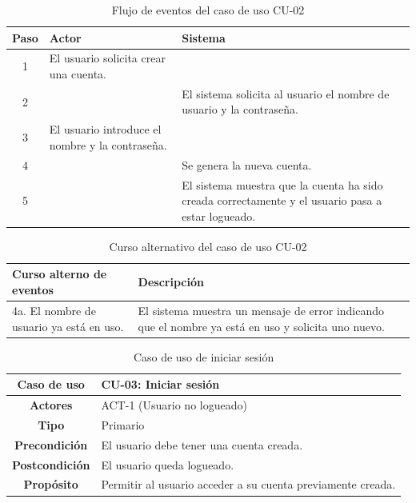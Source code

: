 \begin{table}[H]
\centering
\begin{tabular}{|c|p{5cm}|p{5cm}|}
\hline
\rowcolor{green!40} \textbf{Paso} & \textbf{Actor} & \textbf{Sistema} \\ \hline
\rowcolor{blue!10} 1 & El usuario solicita crear una cuenta. & \\ \hline
\rowcolor{blue!10} 2 & & El sistema solicita al usuario el nombre de usuario y la contraseña. \\ \hline
\rowcolor{blue!10} 3 & El usuario introduce el nombre y la contraseña. & \\ \hline
\rowcolor{blue!10} 4 & & Se genera la nueva cuenta. \\ \hline
\rowcolor{blue!10} 5 & & El sistema muestra que la cuenta ha sido creada correctamente y el usuario pasa a estar logueado. \\ \hline
\end{tabular}
\caption{Flujo de eventos del caso de uso CU-02}
\end{table}

\begin{table}[H]
\centering
\begin{tabular}{|p{4cm}|p{8cm}|}
\hline
\rowcolor{green!40} \textbf{Curso alterno de eventos} & \textbf{Descripción} \\ \hline
\rowcolor{blue!10} 4a. El nombre de usuario ya está en uso. & El sistema muestra un mensaje de error indicando que el nombre ya está en uso y solicita uno nuevo. \\ \hline
\end{tabular}
\caption{Curso alternativo del caso de uso CU-02}
\end{table}

\begin{table}[H]
\centering
\begin{tabular}{|c|p{10cm}|}
\hline
\rowcolor{green!40} \textbf{Caso de uso} & CU-03: Iniciar sesión \\ \hline
\rowcolor{blue!10} \textbf{Actores} & ACT-1 (Usuario no logueado) \\ \hline
\rowcolor{blue!10} \textbf{Tipo} & Primario \\ \hline
\rowcolor{blue!10} \textbf{Precondición} & El usuario debe tener una cuenta creada. \\ \hline
\rowcolor{blue!10} \textbf{Postcondición} & El usuario queda logueado. \\ \hline
\rowcolor{blue!10} \textbf{Propósito} & Permitir al usuario acceder a su cuenta previamente creada. \\ \hline
\end{tabular}
\caption{Caso de uso de iniciar sesión}
\end{table}

